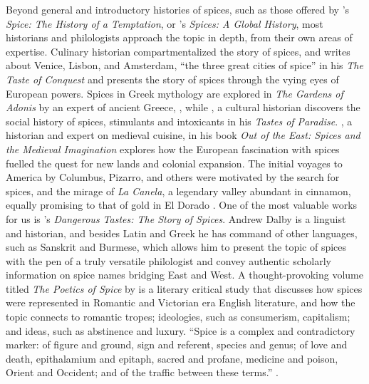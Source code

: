 Beyond general and introductory histories of spices, such as those offered by \textcite{turner_spice_2004}'s \textit{Spice: The History of a Temptation}, or \textcite{czarra_spices_2009}'s \textit{Spices: A Global History}, most historians and philologists approach the topic in depth, from their own areas of expertise. Culinary historian \textcite{krondl_taste_2007} compartmentalized the story of spices, and writes about Venice, Lisbon, and Amsterdam, ``the three great cities of spice'' in his \textit{The Taste of Conquest} and presents the story of spices through the vying eyes of European powers. Spices in Greek mythology are explored in \textit{The Gardens of Adonis} by an expert of ancient Greece, \textcite{detienne_gardens_1994}, while \textcite{schivelbusch_tastes_1992}, a cultural historian discovers the social history of spices, stimulants and intoxicants in his \textit{Tastes of Paradise}. \textcite{freedman_out_2008}, a historian and expert on medieval cuisine, in his book \textit{Out of the East: Spices and the Medieval Imagination} explores how the European fascination with spices fuelled the quest for new lands and colonial expansion. The initial voyages to America by Columbus, Pizarro, and others were motivated by the search for spices, and the mirage of \textit{La Canela}, a legendary valley abundant in cinnamon, equally promising to that of gold in El Dorado \autocite{dalby_christopher_2001}. One of the most valuable works for us is \textcite{dalby_dangerous_2000}'s \textit{Dangerous Tastes: The Story of Spices}. Andrew Dalby is a linguist and historian, and besides Latin and Greek he has command of other languages, such as Sanskrit and Burmese, which allows him to present the topic of spices with the pen of a truly versatile philologist and convey authentic scholarly information on spice names bridging East and West. A thought-provoking volume titled \textit{The Poetics of Spice} by \textcite{morton_poetics_2006} is a literary critical study that discusses how spices were represented in Romantic and Victorian era English literature, and how the topic connects to romantic tropes; ideologies, such as consumerism, capitalism; and ideas, such as abstinence and luxury. ``Spice is a complex and contradictory marker: of figure and ground, sign and referent, species and genus; of love and death, epithalamium and epitaph, sacred and profane, medicine and poison, Orient and Occident; and of the traffic between these terms.'' \autocite[9]{morton_poetics_2006}.

